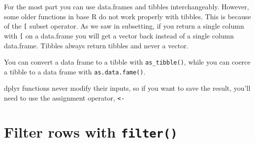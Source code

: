 \documentclass[]{book}
\newenvironment{Shaded}{\begin{snugshade}}{\end{snugshade}}
\newcommand{\CommentTok}[1]{\textcolor[rgb]{0.56,0.35,0.01}{\textit{#1}}}
\newcommand{\DataTypeTok}[1]{\textcolor[rgb]{0.13,0.29,0.53}{#1}}
\newcommand{\DecValTok}[1]{\textcolor[rgb]{0.00,0.00,0.81}{#1}}
\newcommand{\KeywordTok}[1]{\textcolor[rgb]{0.13,0.29,0.53}{\textbf{#1}}}
\newcommand{\NormalTok}[1]{#1}
\newcommand{\OperatorTok}[1]{\textcolor[rgb]{0.81,0.36,0.00}{\textbf{#1}}}
\newcommand{\StringTok}[1]{\textcolor[rgb]{0.31,0.60,0.02}{#1}}
\theoremstyle{definition}
\theoremstyle{definition}
\theoremstyle{definition}
\theoremstyle{remark}
\let\BeginKnitrBlock\begin \let\EndKnitrBlock\end
\begin{document}
\begin{Shaded}
\end{Shaded}

For the most part you can use data.frames and tibbles interchangeably.
However, some older functions in base R do not work properly with
tibbles. This is because of the \texttt{{[}} subset operator. As we saw
in subsetting, if you return a single column with \texttt{{[}} on a
data.frame you will get a vector back instead of a single column
data.frame. Tibbles always return tibbles and never a vector.

You can convert a data frame to a tibble with \texttt{as\_tibble()},
while you can coerce a tibble to a data frame with
\texttt{as.data.fame()}.

\BeginKnitrBlock{rmdimportant}
dplyr functions never modify their inputs, so if you want to save the
result, you'll need to use the assignment operator,
\texttt{\textless{}-}
\EndKnitrBlock{rmdimportant}

\hypertarget{filter-rows-with-filter}{%
\section{\texorpdfstring{Filter rows with
\texttt{filter()}}{Filter rows with filter()}}\label{filter-rows-with-filter}}
\end{document}
